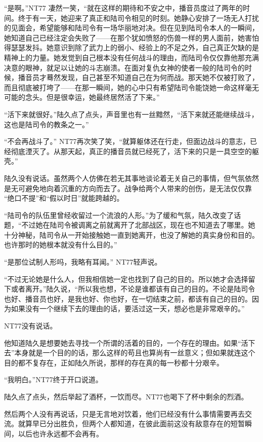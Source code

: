 “是啊。”NT77 凄然一笑，“就在这样的期待和不安之中，播音员度过了两年的时间。终于有一天，她迎来了真正和陆司令相见的时刻。她静心安排了一场无人打扰的见面会，希望能够和陆司令有一场华丽地对决。但在见到陆司令本人的一瞬间，她知道自己已经注定会失败了——在那个犹如愤怒的伤兽一样的男人面前，她害怕得瑟瑟发抖。她意识到除了武力上的弱小、经验上的不足之外，自己真正欠缺的是精神上的力量。她发觉到自己根本没有任何战斗的理由，而陆司令仅仅靠他那充满决意的眼神，就足以让她的斗志崩溃。在面对复仇女神的使者一般的陆司令的时候，播音员才蓦然发现，自己甚至不知道自己在为何而战。那天她不仅被打败了，而且彻底被打垮了——在那一瞬间，她的心中只有希望陆司令能饶她一命这样毫无可能的念头。但是很幸运，她最终居然活了下来。”

“活下来就很好。”陆久点了点头，声音里也有一丝黯然，“活下来就还能继续战斗，这也是陆司令的教条之一。”

“不会再战斗了。” NT77再次笑了笑，“就算躯体还在行走，但面边战斗的意志，已经彻底湮灭了。从那天起，真正的播音员就已经死了，活下来的只是一具空空的躯壳。”

陆久没有说话。虽然两个人仿佛在若无其事地谈论着无关自己的事情，但气氛依然是无可避免地向着沉重的方向而去了。战争给两个人带来的创伤，是无法仅仅靠 “绝口不提”和“假以时日”就能跨越的。

“陆司令的队伍里曾经收留过一个流浪的人形。”为了缓和气氛，陆久改变了话题，“不过她在陆司令被调离之前就离开了北部战区，现在也不知道去了哪里。她十分神秘，陆司令从一开始接触她一直到她离开，也没了解她的真实身份和目的。也许那时的她根本就没有什么目的。”

“是那位试制人形吗，我略有耳闻。” NT77轻声说。

“不过无论她是什么人，但我相信她一定也找到了自己的目的。所以她才会选择留下或者离开。”陆久说，“所以我也想，不论是谁都该有自己的目的。不论是陆司令也好、播音员也好，是我也好、你也好，在一切结束之前，都该有自己的目的。因为如果没有一个继续下去的理由的话，要活过这一天，想必也是非常艰辛的。”

NT77没有说话。

他知道陆久是想要她去寻找一个所谓的活着的目的，一个存在的理由。如果“活下去”本身就是一个目的的话，那么这样的苟且也算尚有一丝意义；但如果就连这个目的都不复存在，正如陆久所说，那样的存在真的每一秒都十分艰辛。

“我明白。”NT77终于开口说道。

陆久点了点头，然后举起了酒杯，一饮而尽。NT77也喝下了杯中剩余的烈酒。

然后两个人没有再说话，只是无言地对饮着，他们已经没有什么事情需要再去交流。就算早已分出胜负，但两个人都知道，在彼此面前这没有敌意存在的短暂瞬间，以后也许永远都不会再有。

